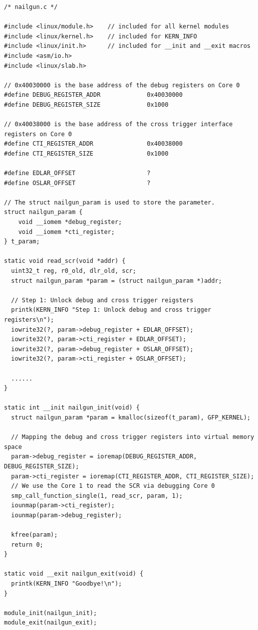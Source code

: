 \begin{lstlisting}
/* nailgun.c */

#include <linux/module.h>    // included for all kernel modules
#include <linux/kernel.h>    // included for KERN_INFO
#include <linux/init.h>      // included for __init and __exit macros
#include <asm/io.h>
#include <linux/slab.h>

// 0x40030000 is the base address of the debug registers on Core 0
#define DEBUG_REGISTER_ADDR             0x40030000
#define DEBUG_REGISTER_SIZE             0x1000

// 0x40038000 is the base address of the cross trigger interface registers on Core 0
#define CTI_REGISTER_ADDR               0x40038000
#define CTI_REGISTER_SIZE               0x1000

#define EDLAR_OFFSET                    ?
#define OSLAR_OFFSET                    ?

// The struct nailgun_param is used to store the parameter.
struct nailgun_param {
    void __iomem *debug_register;
    void __iomem *cti_register;
} t_param;

static void read_scr(void *addr) {
  uint32_t reg, r0_old, dlr_old, scr;
  struct nailgun_param *param = (struct nailgun_param *)addr;

  // Step 1: Unlock debug and cross trigger reigsters
  printk(KERN_INFO "Step 1: Unlock debug and cross trigger registers\n");
  iowrite32(?, param->debug_register + EDLAR_OFFSET);
  iowrite32(?, param->cti_register + EDLAR_OFFSET);
  iowrite32(?, param->debug_register + OSLAR_OFFSET);
  iowrite32(?, param->cti_register + OSLAR_OFFSET);

  ......
}

static int __init nailgun_init(void) {
  struct nailgun_param *param = kmalloc(sizeof(t_param), GFP_KERNEL);
  
  // Mapping the debug and cross trigger registers into virtual memory space 
  param->debug_register = ioremap(DEBUG_REGISTER_ADDR, DEBUG_REGISTER_SIZE);
  param->cti_register = ioremap(CTI_REGISTER_ADDR, CTI_REGISTER_SIZE);
  // We use the Core 1 to read the SCR via debugging Core 0
  smp_call_function_single(1, read_scr, param, 1);
  iounmap(param->cti_register);
  iounmap(param->debug_register);

  kfree(param);
  return 0;
}

static void __exit nailgun_exit(void) {
  printk(KERN_INFO "Goodbye!\n");
}

module_init(nailgun_init);
module_exit(nailgun_exit);

\end{lstlisting}

